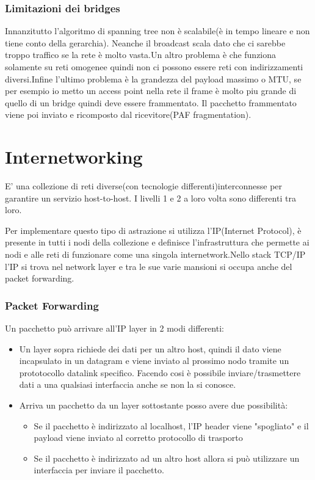 \subsubsection{Limitazioni dei bridges}
Innanzitutto l'algoritmo di spanning tree non è scalabile(è in tempo lineare e non tiene conto della gerarchia). Neanche il broadcast scala dato che ci sarebbe troppo traffico se la rete è molto vasta.Un altro problema è che funziona solamente su reti omogenee quindi non ci possono essere reti con indirizzamenti diversi.Infine l'ultimo problema è la grandezza del payload massimo o MTU, se per esempio io metto un access point nella rete il frame è molto piu grande di quello di un bridge quindi deve essere frammentato. Il pacchetto frammentato viene poi inviato e ricomposto dal ricevitore(PAF fragmentation).
\section{Internetworking}
\begin{definition}
  E' una collezione di reti diverse(con tecnologie differenti)interconnesse per garantire un servizio host-to-host. I livelli 1 e 2 a loro volta sono differenti tra loro.
\end{definition}
Per implementare questo tipo di astrazione si utilizza l'IP(Internet Protocol), è presente in tutti i nodi della collezione e definisce l'infrastruttura che permette ai nodi e alle reti di funzionare come una singola internetwork.Nello stack TCP/IP l'IP si trova nel network layer e tra le sue varie mansioni si occupa anche del packet forwarding.
\subsubsection{Packet Forwarding}
Un pacchetto può arrivare all'IP layer in 2 modi differenti:
\begin{itemize}
  \item Un layer sopra richiede dei dati per un altro host, quindi il dato viene incapsulato in un datagram e viene inviato al prossimo nodo tramite un prototocollo datalink specifico. Facendo cosi è possibile inviare/trasmettere dati a una qualsiasi interfaccia anche se non la si conosce.
  \item Arriva un pacchetto da un layer sottostante posso avere due possibilità:
        \begin{itemize}
          \item Se il pacchetto è indirizzato al localhost, l'IP header viene "spogliato" e il payload viene inviato al corretto protocollo di trasporto
          \item Se il pacchetto è indirizzato ad un altro host allora si può utilizzare un interfaccia per inviare il pacchetto.
        \end{itemize}
\end{itemize}
